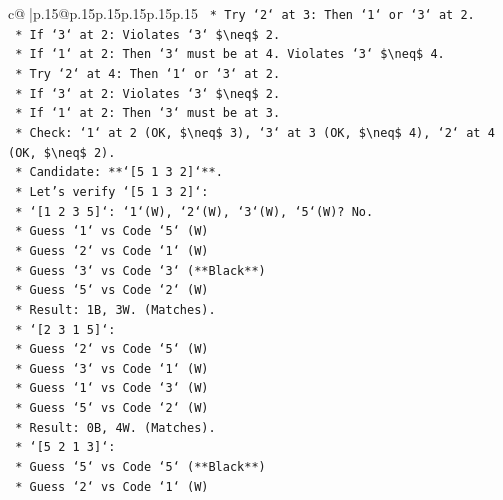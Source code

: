 \documentclass{article}
\begin{document}
{\begin{supertabular}{c@{$\;$}|p{.15\linewidth}@{}p{.15\linewidth}p{.15\linewidth}p{.15\linewidth}p{.15\linewidth}p{.15\linewidth}}
{{{\texttt{            *   Try `2` at 3: Then `1` or `3` at 2.} \\
\texttt{                *   If `3` at 2: Violates `3` \$\textbackslash{}neq\$ 2.} \\
\texttt{                *   If `1` at 2: Then `3` must be at 4. Violates `3` \$\textbackslash{}neq\$ 4.} \\
\texttt{            *   Try `2` at 4: Then `1` or `3` at 2.} \\
\texttt{                *   If `3` at 2: Violates `3` \$\textbackslash{}neq\$ 2.} \\
\texttt{                *   If `1` at 2: Then `3` must be at 3.} \\
\texttt{                    *   Check: `1` at 2 (OK, \$\textbackslash{}neq\$ 3), `3` at 3 (OK, \$\textbackslash{}neq\$ 4), `2` at 4 (OK, \$\textbackslash{}neq\$ 2).} \\
\texttt{                    *   Candidate: **`{[}5 1 3 2{]}`**.} \\
\texttt{        *   Let's verify `{[}5 1 3 2{]}`:} \\
\texttt{            *   `{[}1 2 3 5{]}`: `1`(W), `2`(W), `3`(W), `5`(W)? No.} \\
\texttt{                *   Guess `1` vs Code `5` (W)} \\
\texttt{                *   Guess `2` vs Code `1` (W)} \\
\texttt{                *   Guess `3` vs Code `3` (**Black**)} \\
\texttt{                *   Guess `5` vs Code `2` (W)} \\
\texttt{                *   Result: 1B, 3W. (Matches).} \\
\texttt{            *   `{[}2 3 1 5{]}`:} \\
\texttt{                *   Guess `2` vs Code `5` (W)} \\
\texttt{                *   Guess `3` vs Code `1` (W)} \\
\texttt{                *   Guess `1` vs Code `3` (W)} \\
\texttt{                *   Guess `5` vs Code `2` (W)} \\
\texttt{                *   Result: 0B, 4W. (Matches).} \\
\texttt{            *   `{[}5 2 1 3{]}`:} \\
\texttt{                *   Guess `5` vs Code `5` (**Black**)} \\
\texttt{                *   Guess `2` vs Code `1` (W)} \\
}}}
\end{supertabular}}
\end{document}
